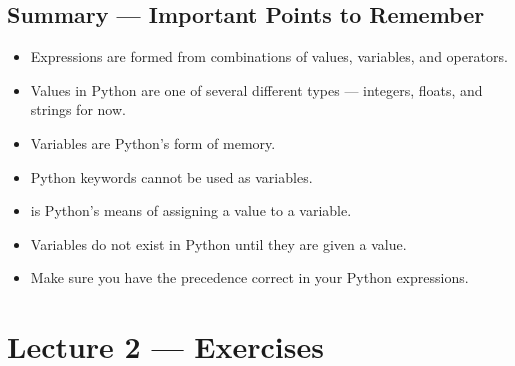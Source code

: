\documentclass[letterpaper,10pt,english]{sphinxmanual}
\begin{document}
\begin{enumerate}
\begin{sphinxVerbatim}[commandchars=\\\{\}]
  
  
  
 
      
  
    
 
    
 
\end{sphinxVerbatim}

\end{enumerate}


\section{Summary — Important Points to Remember}
\label{\detokenize{lecture_notes/lec02_calculator:summary-important-points-to-remember}}\begin{itemize}
\item {} 
Expressions are formed from combinations of values, variables, and
operators.

\item {} 
Values in Python are one of several different types — integers,
floats, and strings for now.

\item {} 
Variables are Python’s form of memory.

\item {} 
Python keywords cannot be used as variables.

\item {} 
\sphinxcode{\sphinxupquote{=}} is Python’s means of assigning a value to a variable.

\item {} 
Variables do not exist in Python until they are given a value.

\item {} 
Make sure you have the precedence correct in your Python expressions.

\end{itemize}


\chapter{Lecture 2 — Exercises}
\label{\detokenize{lecture_notes/lec02_calculator_exercises/exercises:lecture-2-exercises}}\label{\detokenize{lecture_notes/lec02_calculator_exercises/exercises::doc}}
\end{document}
